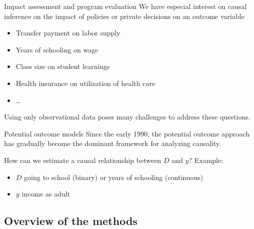\documentclass[handout]{beamer}
\begin{document}
\begin{frame}{Impact assessment and program evaluation}
We have especial interest on causal inference on the impact of policies or private decisions on an outcome variable
\begin{itemize}
	\item Transfer payment on labor supply
	\item Years of schooling on wage
	\item Class size on student learnings
	\item Health insurance on utilization of health care
	\item \dots

\end{itemize}\bigskip

Using only observational data poses many challenges to address these questions.
\end{frame}

\begin{frame}{Potential outcome models}
Since the early 1990, the potential outcome approach has gradually become the dominant framework for analyzing causality.\medskip

How can we estimate a causal relationship between $D$ and $y$?
%
Example: \begin{itemize}
	\item $D$ going to school (binary) or years of schooling (continuous)
	\item $y$ income as adult
\end{itemize}

\end{frame}


\subsection{Overview of the methods}
\end{document}
